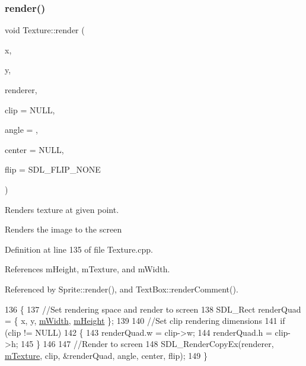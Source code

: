 \subsubsection{\texorpdfstring{render()}{render()}}
{\footnotesize\ttfamily void Texture\+::render (\begin{DoxyParamCaption}\item[{int}]{x,  }\item[{int}]{y,  }\item[{S\+D\+L\+\_\+\+Renderer $\ast$}]{renderer,  }\item[{S\+D\+L\+\_\+\+Rect $\ast$}]{clip = {\ttfamily NULL},  }\item[{double}]{angle = {},  }\item[{S\+D\+L\+\_\+\+Point $\ast$}]{center = {\ttfamily NULL},  }\item[{S\+D\+L\+\_\+\+Renderer\+Flip}]{flip = {\ttfamily SDL\+\_\+FLIP\+\_\+NONE} }\end{DoxyParamCaption})}



Renders texture at given point. 

Renders the image to the screen 

Definition at line 135 of file Texture.\+cpp.



References m\+Height, m\+Texture, and m\+Width.



Referenced by Sprite\+::render(), and Text\+Box\+::render\+Comment().


\begin{DoxyCode}
136 \{
137     \textcolor{comment}{//Set rendering space and render to screen}
138     SDL\_Rect renderQuad = \{ x, y, \hyperlink{class_texture_a0e007f4b4f1a314e5b0dae1402a13afb}{mWidth}, \hyperlink{class_texture_ad7078e03c0ef6e69b733eb85fd72aec2}{mHeight} \};
139 
140     \textcolor{comment}{//Set clip rendering dimensions}
141     \textcolor{keywordflow}{if} (clip != NULL)
142     \{
143         renderQuad.w = clip->w;
144         renderQuad.h = clip->h;
145     \}
146 
147     \textcolor{comment}{//Render to screen}
148     SDL\_RenderCopyEx(renderer, \hyperlink{class_texture_a28e61626f21dd1c69968e53687a13424}{mTexture}, clip, &renderQuad, angle, center, flip);
149 \}
\end{DoxyCode}
\mbox{\label{class_texture_ab3149eb648f437a09dc0938942c2c4ce}} 
